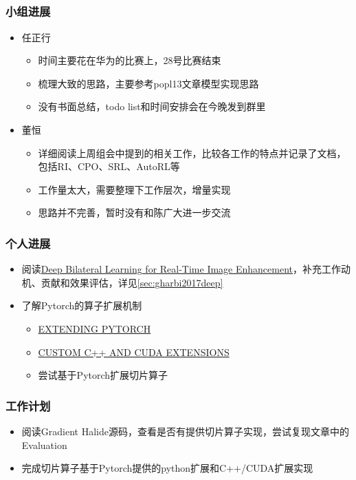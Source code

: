 \subsection{\ZhangYX}

\subsubsection{小组进展}

\begin{itemize}
\item 任正行
  \begin{itemize}
    \item 时间主要花在华为的比赛上，28号比赛结束
    \item 梳理大致的思路，主要参考popl13文章模型实现思路
    \item 没有书面总结，todo list和时间安排会在今晚发到群里
  \end{itemize}
\item 董恒
  \begin{itemize}
    \item 详细阅读上周组会中提到的相关工作，比较各工作的特点并记录了文档，包括RI、CPO、SRL、AutoRL等
    \item 工作量太大，需要整理下工作层次，增量实现
    \item 思路并不完善，暂时没有和陈广大进一步交流
  \end{itemize}
\end{itemize}

\subsubsection{个人进展}

\begin{itemize}
  \item 阅读\href{https://groups.csail.mit.edu/graphics/hdrnet/data/hdrnet.pdf}{Deep Bilateral Learning for Real-Time Image Enhancement\cite{gharbi2017deep}}，补充工作动机、贡献和效果评估，详见\autoref{sec:gharbi2017deep}
  \item 了解Pytorch的算子扩展机制
  \begin{itemize}
    \item \href{https://pytorch.org/docs/master/notes/extending.html}{EXTENDING PYTORCH}
    \item \href{https://pytorch.org/tutorials/advanced/cpp_extension.html}{CUSTOM C++ AND CUDA EXTENSIONS}
    \item 尝试基于Pytorch扩展切片算子
  \end{itemize}
\end{itemize}

\subsubsection{工作计划}

\begin{itemize}
  \item 阅读Gradient Halide源码，查看是否有提供切片算子实现，尝试复现文章中的Evaluation
  \item 完成切片算子基于Pytorch提供的python扩展和C++/CUDA扩展实现
\end{itemize}
